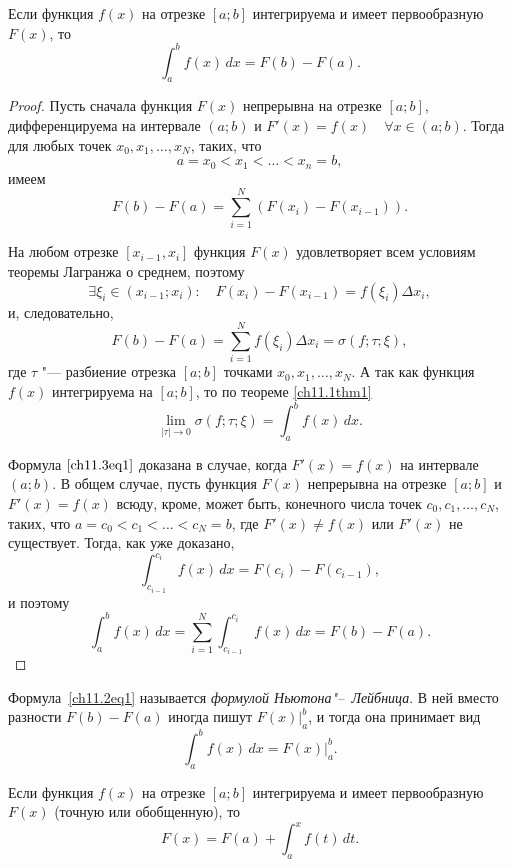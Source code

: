 \begin{thm}
Если функция $f(x)$ на отрезке $[a; b]$ интегрируема и имеет первообразную $F(x)$, то
\begin{equation} \label{ch11.3eq1}
\int_{a}^{b} f(x) \,dx = F(b) - F(a).
\end{equation}
\end{thm}

\begin{proof}
Пусть сначала функция $F(x)$ непрерывна на отрезке $[a;b]$, дифференцируема на интервале $(a;b)$ и $F'(x) = f(x) \quad \forall x \in (a;b)$. Тогда для любых точек $x_0, x_1, \ldots, x_N$, таких, что
$$
a = x_0 < x_1 < \ldots < x_n = b,
$$
имеем
$$
F(b) - F(a) = \sum_{i = 1}^{N} \left( F(x_i) - F(x_{i - 1}) \right).
$$

На любом отрезке $[x_{i - 1}, x_i]$ функция $F(x)$ удовлетворяет всем условиям теоремы Лагранжа о среднем, поэтому
$$
\exists \xi_i \in (x_{i - 1}; x_i): \quad F(x_i) - F(x_{i - 1}) = f(\xi_i) \Delta x_i,
$$
и, следовательно,
$$
F(b) - F(a) = \sum_{i = 1}^{N} f(\xi_i) \Delta x_i = \sigma(f;\tau;\xi),
$$
где $\tau$ "--- разбиение отрезка $[a;b]$ точками $x_0, x_1, \ldots, x_N$. А так как функция $f(x)$ интегрируема на $[a;b]$, то по теореме  \ref{ch11.1thm1}
$$
\lim_{|\tau| \to 0} \sigma (f;\tau; \xi) = \int_{a}^{b} f(x) \,dx.
$$

Формула $\eqref{ch11.3eq1}$ доказана в случае, когда $F'(x) = f(x)$ на интервале $(a;b)$. В общем случае, пусть функция $F(x)$ непрерывна на отрезке $[a;b]$ и $F'(x) = f(x)$ всюду, кроме, может быть, конечного числа точек $c_0, c_1, \ldots, c_N$, таких, что $a = c_0 < c_1 < \ldots < c_N = b$, где $F'(x) \not= f(x)$ или $F'(x)$ не существует. Тогда, как уже доказано,
$$
\int_{c_{i - 1}}^{c_i} f(x) \,dx = F(c_i) - F(c_{i - 1}),
$$
и поэтому
\begin{equation*}
\int_{a}^{b} f(x) \,dx = \sum_{i = 1}^{N} \int_{c_{i - 1}}^{c_{i}} f(x) \,dx = F(b) - F(a). \tag*{$\qedhere$}
\end{equation*}
\end{proof}


Формула~\eqref{ch11.2eq1} называется \textit{формулой Ньютона"--~Лейбница}. В ней вместо разности $F(b) - F(a)$ иногда пишут $F(x)\big|_{a}^{b}$, и тогда она принимает вид
$$
\int_{a}^{b} f(x) \,dx = F(x)\bigg|_{a}^{b}.
$$

\begin{cons}
Если функция $f(x)$ на отрезке $[a;b]$ интегрируема и имеет первообразную $F(x)$ (точную или обобщенную), то
$$
F(x) = F(a) + \int_{a}^{x} f(t)\,dt.
$$
\end{cons}

